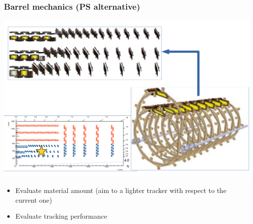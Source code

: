 \documentclass[pdftex, 11pt]{beamer}
\begin{document}
\begin{frame}
  \frametitle{Barrel mechanics (PS alternative)}
  \begin{center}
    \includegraphics[width=\textwidth]{img/mechanics4.pdf}
  \end{center}
\end{frame}

\begin{frame}
  \begin{itemize}
  \item Evaluate \alert{material} amount (aim to a lighter tracker with respect to the current one)
  \item Evaluate tracking \alert{performance}
  \end{itemize}
\end{frame}
\end{document}
